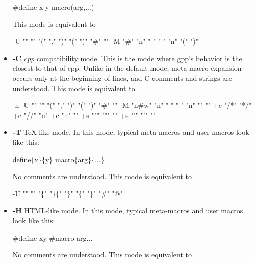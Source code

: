 \begin{itemize}
\begin{PRE}
  \#define x y
  macro(arg,...)
\end{PRE}

This mode is equivalent to 

\begin{PRE}
  -U "" "" "(" "," ")" "(" ")" "\#" "{\htmlBackslash}{\htmlBackslash}"
  -M "\#" "{\htmlBackslash}n" " " " " "{\htmlBackslash}n" "(" ")"
\end{PRE}

\item {\bf -C}\htmlBR
{\it cpp} compatibility mode. This is the mode where gpp's behavior is the
closest to that of cpp. Unlike in the default mode, meta-macro expansion
occurs only at the beginning of lines, and C comments and strings are
understood. This mode is equivalent to 

\begin{PRE}
  -n -U "" "" "(" "," ")" "(" ")" "\#" ""
  -M "{\htmlBackslash}n\#{\htmlBackslash}w" "{\htmlBackslash}n" " " " " "{\htmlBackslash}n" "" ""
  +c "/*" "*/" +c "//" "{\htmlBackslash}n" +c "{\htmlBackslash}{\htmlBackslash}{\htmlBackslash}n" ""
  +s "{\htmlBackslash}"" "{\htmlBackslash}"" "{\htmlBackslash}{\htmlBackslash}" +s "'" "'" "{\htmlBackslash}{\htmlBackslash}"
\end{PRE}

\item {\bf -T}\htmlBR
TeX-like mode. In this mode, typical meta-macros and user macros look like
this: 

\begin{PRE}
  {\htmlBackslash}define\{x\}\{y\}
  {\htmlBackslash}macro\{arg\}\{...\}
\end{PRE}

No comments are understood. This mode is equivalent to 

\begin{PRE}
  -U "{\htmlBackslash}{\htmlBackslash}" "" "\{" "\}\{" "\}" "\{" "\}" "\#" "@"
\end{PRE}

\item {\bf -H}\htmlBR
HTML-like mode. In this mode, typical meta-macros and user macros look like
this: 

\begin{PRE}
  {\htmlLt}\#define x{\htmlBar}y{\htmlGt}
  {\htmlLt}\#macro arg{\htmlBar}...{\htmlGt}
\end{PRE}

No comments are understood. This mode is equivalent to 


\end{itemize}
